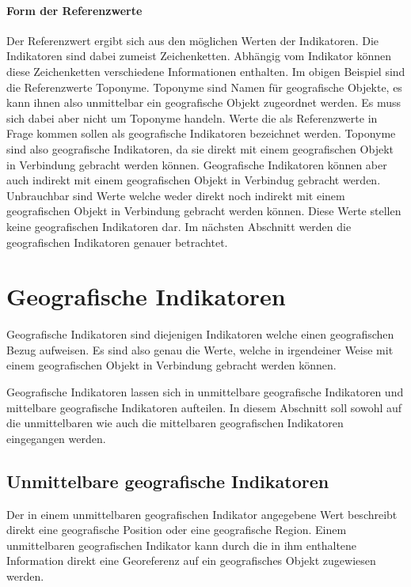 			\paragraph{Form der Referenzwerte}

				Der Referenzwert ergibt sich aus den möglichen Werten der Indikatoren.
				Die Indikatoren sind dabei zumeist Zeichenketten.
				Abhängig vom Indikator können diese Zeichenketten verschiedene Informationen enthalten.
				Im obigen Beispiel sind die Referenzwerte Toponyme.
				Toponyme sind Namen für geografische Objekte, es kann ihnen also unmittelbar ein geografische Objekt zugeordnet werden.
				Es muss sich dabei aber nicht um Toponyme handeln.
				Werte die als Referenzwerte in Frage kommen sollen als geografische Indikatoren bezeichnet werden.
				Toponyme sind also geografische Indikatoren, da sie direkt mit einem geografischen Objekt in Verbindung gebracht werden können.
				Geografische Indikatoren können aber auch indirekt mit einem geografischen Objekt in Verbindug gebracht werden.
				Unbrauchbar sind Werte welche weder direkt noch indirekt mit einem geografischen Objekt in Verbindung gebracht werden können.
				Diese Werte stellen keine geografischen Indikatoren dar.
				Im nächsten Abschnitt werden die geografischen Indikatoren genauer betrachtet.

	\section{Geografische Indikatoren} 

		Geografische Indikatoren sind diejenigen Indikatoren welche einen geografischen Bezug aufweisen.
		Es sind also genau die Werte, welche in irgendeiner Weise mit einem geografischen Objekt in Verbindung gebracht werden können.

		Geografische Indikatoren lassen sich in unmittelbare geografische Indikatoren und mittelbare geografische Indikatoren aufteilen. 
		In diesem Abschnitt soll sowohl auf die unmittelbaren wie auch die mittelbaren geografischen Indikatoren eingegangen werden.

			\subsection{Unmittelbare geografische Indikatoren} \label{subsec:unmittelbareGeografischeIndikatoren} 

				Der in einem unmittelbaren geografischen Indikator angegebene Wert beschreibt direkt eine geografische Position oder eine geografische Region.	
				Einem unmittelbaren geografischen Indikator kann durch die in ihm enthaltene Information direkt eine Georeferenz auf ein geografisches Objekt zugewiesen werden. 

